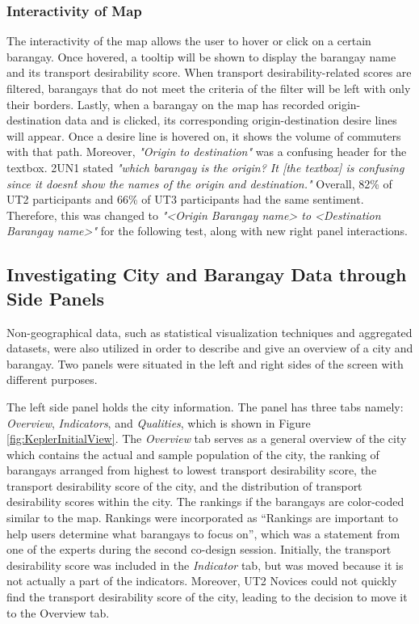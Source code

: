 \documentclass{sigchi}
\begin{document}
\subsubsection{Interactivity of Map}
The interactivity of the map allows the user to hover or click on a certain barangay. Once hovered, a tooltip will be shown to display the barangay name and its transport desirability score. When transport desirability-related scores are filtered, barangays that do not meet the criteria of the filter will be left with only their borders.  Lastly, when a barangay on the map has recorded origin-destination data and is clicked, its corresponding origin-destination desire lines will appear. Once a desire line is hovered on, it shows the volume of commuters with that path. Moreover, \textit{"Origin to destination"} was a confusing header for the textbox. 2UN1 stated \textit{"which barangay is the origin? It [the textbox] is confusing since it doesn\'t show the names of the origin and destination."} Overall, 82\% of UT2 participants and 66\% of UT3 participants had the same sentiment. Therefore, this was changed to \textit{"<Origin Barangay name> to <Destination Barangay name>"} for the following test, along with new right panel interactions. 


\subsection{Investigating City and Barangay Data through Side Panels}
Non-geographical data, such as statistical visualization techniques and aggregated datasets, were also utilized in order to describe and give an overview of a city and barangay. Two panels were situated in the left and right sides of the screen with different purposes.

The left side panel holds the city information. The panel has three tabs namely: \textit{Overview}, \textit{Indicators}, and \textit{Qualities}, which is shown in Figure \ref{fig:KeplerInitialView}. The \textit{Overview} tab serves as a general overview of the city which contains the actual and sample population of the city, the ranking of barangays arranged from highest to lowest transport desirability score, the transport desirability score of the city, and the distribution of transport desirability scores within the city. The rankings if the barangays are color-coded similar to the map. Rankings were incorporated as “Rankings are important to help users determine what barangays to focus on”, which was a statement from one of the experts during the second co-design session. Initially, the transport desirability score was included in the \textit{Indicator} tab, but was moved because it is not actually a part of the indicators. Moreover, UT2 Novices could not quickly find the transport desirability score of the city, leading to the decision to move it to the Overview tab. 
\end{document}
